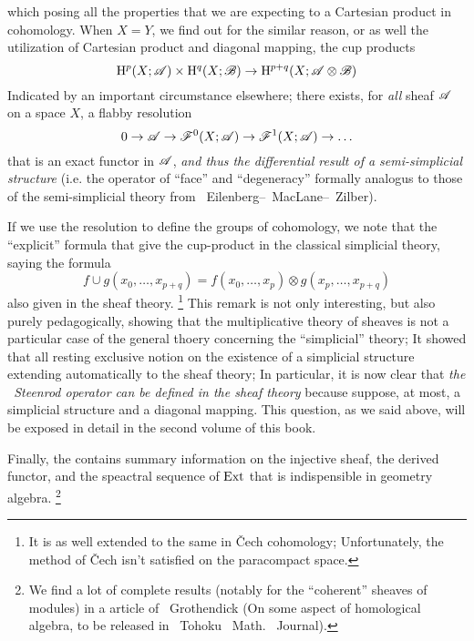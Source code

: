 \oldpage[V]
which posing all the properties that we are expecting to a Cartesian product in cohomology. 
When $X = Y$, we find out for the similar reason, or as well the utilization of Cartesian product and diagonal mapping, 
the cup products 
\[
    \mathrm{H}^p(X;\mathscr{A})\times \mathrm{H}^q(X;\mathscr{B})\rightarrow \mathrm{H}^{p+q}(X; \mathscr{A}\otimes \mathscr{B})
\]
Indicated by an important circumstance elsewhere; there exists, for \emph{all} sheaf $\mathscr{A}$ on a space $X$, a flabby resolution 
\[
    0\rightarrow \mathscr{A} \rightarrow \mathscr{F}^0(X;\mathscr{A}) \rightarrow \mathscr{F}^1(X;\mathscr{A}) \rightarrow \ldots
\]
that is an exact functor in $\mathscr{A}$, \emph{and thus the differential result of a semi-simplicial structure} 
(i.e. the operator of ``face'' and ``degeneracy'' formally analogus to those of the semi-simplicial theory from ~Eilenberg--~MacLane--~Zilber).

If we use the resolution to define the groups of cohomology, 
we note that the ``explicit'' formula that give the cup-product in the classical simplicial theory, saying the formula 
\[
    f\cup g(x_0,\ldots,x_{p+q}) = f(x_0,\ldots,x_p)\otimes g(x_p,\ldots,x_{p+q})
\]
also given in the sheaf theory.
\footnote[1]{It is as well extended to the same in \v{C}ech cohomology; Unfortunately, the method of \v{C}ech isn't satisfied on the paracompact space.}
This remark is not only interesting, but also purely pedagogically, 
showing that the multiplicative theory of sheaves is not a particular case of the general thoery concerning the ``simplicial'' theory;
It showed that all resting exclusive notion on the existence of a simplicial structure extending automatically to the sheaf theory; 
In particular, it is now clear that \emph{the ~Steenrod operator can be defined in the sheaf theory} because suppose, at most, 
a simplicial structure and a diagonal mapping. 
This question, as we said above, will be exposed in detail in the second volume of this book.

Finally, the  contains summary information on the injective sheaf, the derived functor, 
and the speactral sequence of $\operatorname{Ext}$ that is indispensible in geometry algebra.
\footnote[2]{We find a lot of complete results (notably for the ``coherent'' sheaves of modules) in a article of ~Grothendick 
(On some aspect of homological algebra, to be released in ~Tohoku ~Math. ~Journal).}

